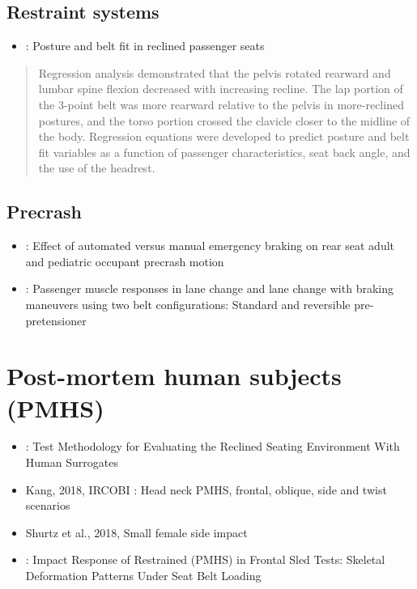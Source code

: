 \documentclass[]{book}
\providecommand{\tightlist}{%
  \setlength{\itemsep}{0pt}\setlength{\parskip}{0pt}}
\begin{document}
\hypertarget{restraint-systems}{%
\subsection{Restraint systems}\label{restraint-systems}}

\begin{itemize}
\tightlist
\item
  \citep{Reed2019} : Posture and belt fit in reclined passenger seats
\end{itemize}

\begin{quote}
Regression analysis demonstrated that the pelvis rotated rearward and lumbar spine flexion decreased with increasing recline. The lap portion of the 3-point belt was more rearward relative to the pelvis in more-reclined postures, and the torso portion crossed the clavicle closer to the midline of the body. Regression equations were developed to predict posture and belt fit variables as a function of passenger characteristics, seat back angle, and the use of the headrest.
\end{quote}

\hypertarget{precrash}{%
\subsection{Precrash}\label{precrash}}

\begin{itemize}
\item
  \citet{Graci2019}: Effect of automated versus manual emergency braking on rear seat adult and pediatric occupant precrash motion
\item
  \citet{Ghaffari2019}: Passenger muscle responses in lane change and lane change with braking maneuvers using two belt configurations: Standard and reversible pre-pretensioner
\end{itemize}

\hypertarget{post-mortem-human-subjects-pmhs}{%
\section{Post-mortem human subjects (PMHS)}\label{post-mortem-human-subjects-pmhs}}

\begin{itemize}
\item
  \citet{Richardson2019} : Test Methodology for Evaluating the Reclined Seating Environment With Human Surrogates
\item
  Kang, 2018, IRCOBI : Head neck PMHS, frontal, oblique, side and twist scenarios
\item
  Shurtz et al., 2018, Small female side impact
\item
  \citet{Shaw2009} : Impact Response of Restrained (PMHS) in Frontal Sled Tests: Skeletal Deformation Patterns Under Seat Belt Loading
\end{itemize}
\end{document}
